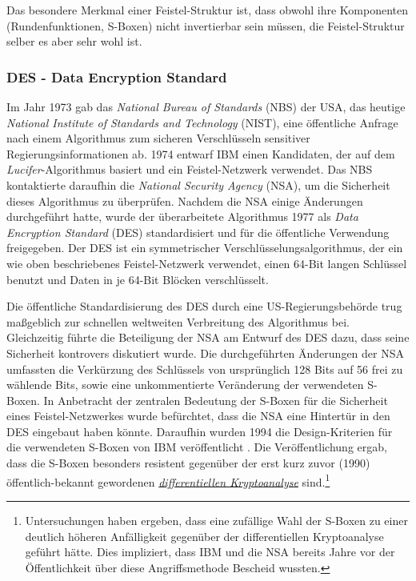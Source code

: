 Das besondere Merkmal einer Feistel-Struktur ist, dass obwohl ihre Komponenten (Rundenfunktionen, S-Boxen) nicht invertierbar sein müssen, die Feistel-Struktur selber es aber sehr wohl ist.

\subsubsection{DES - Data Encryption Standard}
\label{sssec:des}
Im Jahr 1973 gab das \emph{National Bureau of Standards} (NBS) der USA, das heutige \emph{National Institute of Standards and Technology} (NIST), eine öffentliche Anfrage nach einem Algorithmus zum sicheren Verschlüsseln sensitiver Regierungsinformationen ab. 1974 entwarf IBM einen Kandidaten, der auf dem \emph{Lucifer}-Algorithmus basiert und ein Feistel-Netzwerk verwendet. Das NBS kontaktierte daraufhin die \emph{National Security Agency} (NSA), um die Sicherheit dieses Algorithmus zu überprüfen. Nachdem die NSA einige Änderungen durchgeführt hatte, wurde der überarbeitete Algorithmus 1977 als \emph{Data Encryption Standard} (DES) \cite{NIST_DES99} standardisiert und für die öffentliche Verwendung freigegeben. Der DES ist ein symmetrischer Verschlüsselungsalgorithmus, der ein wie oben beschriebenes Feistel-Netzwerk verwendet, einen 64-Bit langen Schlüssel benutzt und Daten in je 64-Bit Blöcken verschlüsselt. 

Die öffentliche Standardisierung des DES durch eine US-Regierungsbehörde trug maßgeblich zur schnellen weltweiten Verbreitung des Algorithmus bei. Gleichzeitig führte die Beteiligung der NSA am Entwurf des DES dazu, dass seine Sicherheit kontrovers diskutiert wurde. Die durchgeführten Änderungen der NSA umfassten die Verkürzung des Schlüssels von ursprünglich 128 Bits auf 56 frei zu wählende Bits, sowie eine unkommentierte Veränderung der verwendeten S-Boxen. In Anbetracht der zentralen Bedeutung der S-Boxen für die Sicherheit eines Feistel-Netzwerkes wurde befürchtet, dass die NSA eine Hintertür in den DES eingebaut haben könnte. Daraufhin wurden 1994 die Design-Kriterien für die verwendeten S-Boxen von IBM veröffentlicht \cite{Coppersmith1994}. Die Veröffentlichung ergab, dass die S-Boxen besonders resistent gegenüber der erst kurz zuvor (1990) öffentlich-bekannt gewordenen \hyperref[sssec:diffKryptoanalyse]{\textit{differentiellen Kryptoanalyse}} sind.\footnote{Untersuchungen haben ergeben, dass eine zufällige Wahl der S-Boxen zu einer deutlich höheren Anfälligkeit gegenüber der differentiellen Kryptoanalyse geführt hätte. Dies impliziert, dass IBM und die NSA bereits Jahre vor der Öffentlichkeit über diese Angriffsmethode Bescheid wussten.}

